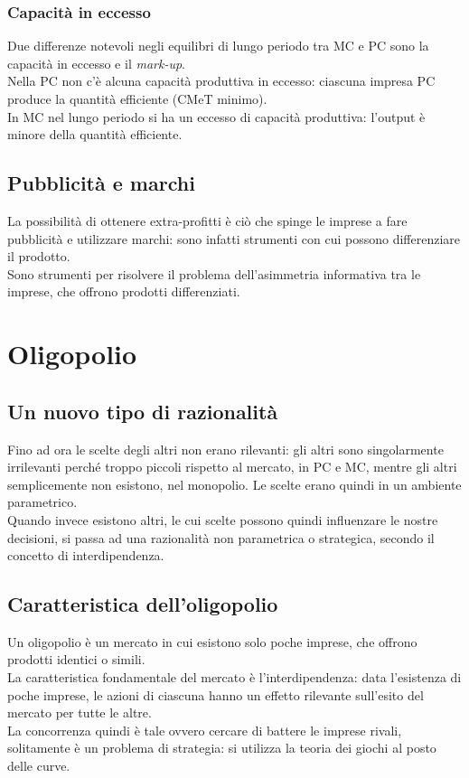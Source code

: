 \documentclass{report}
\begin{document}
	\subsubsection{Capacità in eccesso}
	Due differenze notevoli negli equilibri di lungo periodo tra MC e PC sono la capacità in eccesso e il \textit{mark-up}.
	\medskip \\Nella PC non c'è alcuna capacità produttiva in eccesso: ciascuna impresa PC produce la quantità efficiente (CMeT minimo).
	\medskip \\In MC nel lungo periodo si ha un eccesso di capacità produttiva: l'output è minore della quantità efficiente.
	\subsection{Pubblicità e marchi}
	La possibilità di ottenere extra-profitti è ciò che spinge le imprese a fare pubblicità e utilizzare marchi: sono infatti strumenti con cui possono differenziare il prodotto.
	\medskip \\Sono strumenti per risolvere il problema dell'asimmetria informativa tra le imprese, che offrono prodotti differenziati.
	\section{Oligopolio}
	\subsection{Un nuovo tipo di razionalità}
	Fino ad ora le scelte degli altri non erano rilevanti: gli altri sono singolarmente irrilevanti perché troppo piccoli rispetto al mercato, in PC e MC, mentre gli altri semplicemente non esistono, nel monopolio. Le scelte erano quindi in un ambiente parametrico.
	\medskip \\
	Quando invece esistono altri, le cui scelte possono quindi influenzare le nostre decisioni, si passa ad una razionalità non parametrica o strategica, secondo il concetto di interdipendenza.
	\subsection{Caratteristica dell'oligopolio}
	Un oligopolio è un mercato in cui esistono solo poche imprese, che offrono prodotti identici o simili.\medskip \\La caratteristica fondamentale del mercato è l'interdipendenza: data l'esistenza di poche imprese, le azioni di ciascuna hanno un effetto rilevante sull'esito del mercato per tutte le altre.\medskip \\La concorrenza quindi è tale ovvero cercare di battere le imprese rivali, solitamente è un problema di strategia: si utilizza la teoria dei giochi al posto delle curve.
\end{document}
